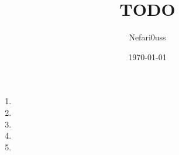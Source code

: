 \documentclass[]{article}
\begin{document}
\title{TODO}
\author{Nefari0uss}
\date{\today}
\maketitle

\begin{enumerate}
  \item
  \item
  \item
  \item
  \item
\end{enumerate}
\end{document}
